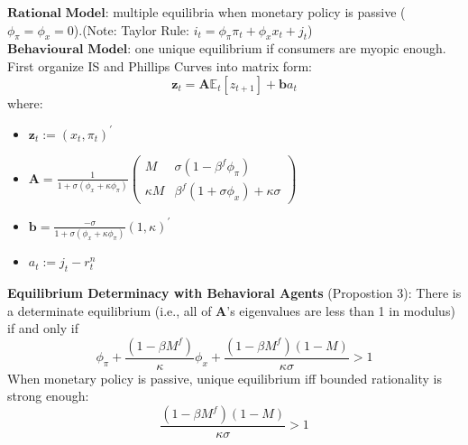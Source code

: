\documentclass{beamer}
\begin{document}
\begin{frame}{\subsecname}
    $\textbf{Rational Model}$: multiple equilibria when monetary policy is passive ($\phi_{\pi}=\phi_{x}=0$).(Note: Taylor Rule: $i_{t}=\phi_{\pi}\pi_{t}+\phi_{x}x_{t}+j_{t}$)\\
    $\textbf{Behavioural Model}$: one unique equilibrium if consumers are myopic enough.\\
    First organize IS and Phillips Curves into matrix form:\\ 
    \begin{equation}\tag{32}                                     \textbf{z}_{t}=\textbf{A}\mathbb{E}_{t}\left[z_{t+1}\right]+\textbf{b}a_{t}
    \end{equation}
    where:
    \begin{itemize}
        \item $\textbf{z}_{t}:=(x_{t},\pi_{t})^{\prime}$
        \item $\textbf{A}=\frac{1}{1+\sigma(\phi_{x}+\kappa\phi_{\pi})}\begin{pmatrix} M & \sigma(1-\beta^{f}\phi_{\pi}) \\ \kappa M & \beta^{f}(1+\sigma\phi_{x})+\kappa\sigma \end{pmatrix}$
        \item $\textbf{b}=\frac{-\sigma}{1+\sigma(\phi_{x}+\kappa\phi_{\pi})}(1,\kappa)^{\prime}$
        \item $a_{t}:=j_{t}-r_{t}^{n}$
    \end{itemize}
\end{frame}

\begin{frame}{\subsecname}
    \textbf{Equilibrium Determinacy with Behavioral Agents} (Propostion 3): There is a determinate equilibrium (i.e., all of $\textbf{A}$’s eigenvalues are less than 1 in modulus) if and only if
    \begin{equation}\tag{34}
        \phi_{\pi}+\frac{(1-\beta M^{f})}{\kappa}\phi_{x}+\frac{(1-\beta M^{f})(1-M)}{\kappa\sigma}>1
    \end{equation}
    When monetary policy is passive, unique equilibrium iff bounded rationality is strong enough:
    \begin{equation}\tag{35}
        \frac{(1-\beta M^{f})(1-M)}{\kappa\sigma}>1
    \end{equation}
\end{frame}
\end{document}
